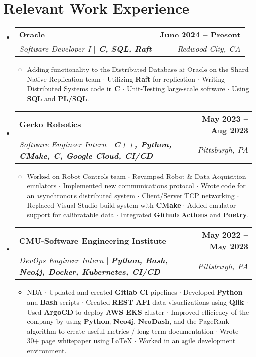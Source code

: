 \documentclass[letterpaper,11pt]{article}
\makeatletter
\newcommand{\resumeItem}[1]{
  \item\small{
    {#1 \vspace{-2pt}}
  }
}
\newcommand{\resumeSubheading}[4]{
  \vspace{-2pt}\item
    \begin{tabular*}{1.0\textwidth}[t]{l@{\extracolsep{\fill}}r}
      \textbf{#1} & \textbf{\small #2} \\
      \textit{\small#3} & \textit{\small #4} \\
    \end{tabular*}\vspace{-7pt}
}
\newcommand{\resumeSubHeadingListStart}{\begin{itemize}[leftmargin=0.0in, label={}]}
\newcommand{\resumeSubHeadingListEnd}{\end{itemize}}
\newcommand{\resumeItemListStart}{\begin{itemize}}
\newcommand{\resumeItemListEnd}{\end{itemize}\vspace{-5pt}}
\makeatother
\begin{document}
\section{Relevant Work Experience}
  \resumeSubHeadingListStart
    \resumeSubheading
      {Oracle}{June 2024 -- Present}
      {Software Developer I $|$ \textbf{\emph{C, SQL, Raft}}}{Redwood City, CA}
      \resumeItemListStart
      \resumeItem {Adding functionality to the Distributed Database at Oracle on the Shard Native Replication team $\cdot$ 
      Utilizing \textbf{Raft} for replication $\cdot$ Writing Distributed Systems code in \textbf{C} $\cdot$ Unit-Testing large-scale software $\cdot$ Using \textbf{SQL} and \textbf{PL/SQL}.}
      \resumeItemListEnd

    \resumeSubheading
      {Gecko Robotics}
      {May 2023 -- Aug 2023}
      {Software Engineer Intern $|$ \textbf{\emph{C++, Python, CMake, C, Google Cloud, CI/CD}}}{Pittsburgh, PA}
      \resumeItemListStart
      \resumeItem {Worked on Robot Controls team $\cdot$ Revamped Robot \& Data Acquisition emulators $\cdot$ 
        Implemented new communications protocol $\cdot$ Wrote code for an asynchronous distributed system $\cdot$ 
        Client/Server TCP networking $\cdot$ Replaced Visual Studio build-system with \textbf{CMake} $\cdot$ Added emulator support
        for calibratable data $\cdot$ Integrated \textbf{Github Actions} and \textbf{Poetry}.}
      \resumeItemListEnd
    
    \resumeSubheading
      {CMU-Software Engineering Institute }{May 2022 -- May 2023}
      {DevOps Engineer Intern  $|$ \textbf{\emph{Python, Bash, Neo4j, Docker, Kubernetes, CI/CD}}}{Pittsburgh, PA}
      \resumeItemListStart
      \resumeItem {NDA $\cdot$ Updated and created \textbf{Gitlab CI} pipelines $\cdot$ Developed \textbf{Python} 
        and \textbf{Bash} scripts $\cdot$ Created
        \textbf{REST API} data visualizations using \textbf{Qlik} $\cdot$ Used \textbf{ArgoCD} to deploy \textbf{AWS EKS} cluster $\cdot$ Improved               
        efficiency of the company by using \textbf{Python}, \textbf{Neo4j}, \textbf{NeoDash}, and the PageRank algorithm to 
        create useful metrics / long-term documentation $\cdot$ Wrote 30+ page whitepaper using LaTeX $\cdot$ 
        Worked in an agile development environment.}
      \resumeItemListEnd
  \resumeSubHeadingListEnd
\vspace{-16pt}
\end{document}
